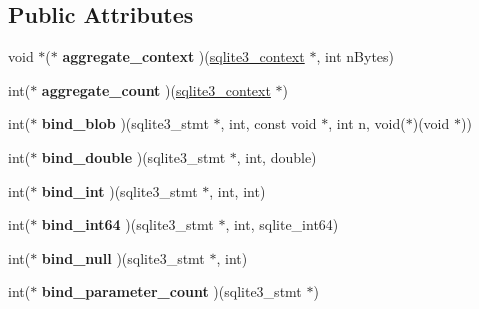 \subsection*{Public Attributes}
\begin{DoxyCompactItemize}
\item 
\hypertarget{structsqlite3__api__routines_a4af9ccf21e07862a8c3636c16d3acd19}{void $\ast$($\ast$ {\bfseries aggregate\-\_\-context} )(\hyperlink{structsqlite3__context}{sqlite3\-\_\-context} $\ast$, int n\-Bytes)}\label{structsqlite3__api__routines_a4af9ccf21e07862a8c3636c16d3acd19}

\item 
\hypertarget{structsqlite3__api__routines_a8373f7a5dd2d6f1c86bbf024b1796156}{int($\ast$ {\bfseries aggregate\-\_\-count} )(\hyperlink{structsqlite3__context}{sqlite3\-\_\-context} $\ast$)}\label{structsqlite3__api__routines_a8373f7a5dd2d6f1c86bbf024b1796156}

\item 
\hypertarget{structsqlite3__api__routines_afeb41d70ab5a221fec488560934c825b}{int($\ast$ {\bfseries bind\-\_\-blob} )(sqlite3\-\_\-stmt $\ast$, int, const void $\ast$, int n, void($\ast$)(void $\ast$))}\label{structsqlite3__api__routines_afeb41d70ab5a221fec488560934c825b}

\item 
\hypertarget{structsqlite3__api__routines_aca43a229ce28397ba8c18a4d6e03e40c}{int($\ast$ {\bfseries bind\-\_\-double} )(sqlite3\-\_\-stmt $\ast$, int, double)}\label{structsqlite3__api__routines_aca43a229ce28397ba8c18a4d6e03e40c}

\item 
\hypertarget{structsqlite3__api__routines_a6fef49e6c9c1fa573c55cc6668a8448f}{int($\ast$ {\bfseries bind\-\_\-int} )(sqlite3\-\_\-stmt $\ast$, int, int)}\label{structsqlite3__api__routines_a6fef49e6c9c1fa573c55cc6668a8448f}

\item 
\hypertarget{structsqlite3__api__routines_a489304cada65abca390da9b751da8800}{int($\ast$ {\bfseries bind\-\_\-int64} )(sqlite3\-\_\-stmt $\ast$, int, sqlite\-\_\-int64)}\label{structsqlite3__api__routines_a489304cada65abca390da9b751da8800}

\item 
\hypertarget{structsqlite3__api__routines_a74d16d0bb57db37d654e95fb7e72c93c}{int($\ast$ {\bfseries bind\-\_\-null} )(sqlite3\-\_\-stmt $\ast$, int)}\label{structsqlite3__api__routines_a74d16d0bb57db37d654e95fb7e72c93c}

\item 
\hypertarget{structsqlite3__api__routines_ab27285b7fb132f697d5ef22f21469dd6}{int($\ast$ {\bfseries bind\-\_\-parameter\-\_\-count} )(sqlite3\-\_\-stmt $\ast$)}\label{structsqlite3__api__routines_ab27285b7fb132f697d5ef22f21469dd6}


\end{DoxyCompactItemize}
